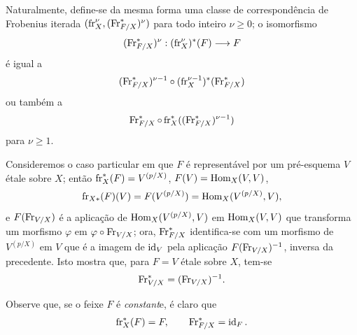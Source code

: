 Naturalmente, define-se da mesma forma uma classe de correspondência de Frobenius iterada $(\operatorname{fr}_X^\nu,(\operatorname{Fr}^*_{F/X})^\nu)$ para todo inteiro $\nu\geq0$; o isomorfismo
\[
(\operatorname{Fr}^*_{F/X})^\nu:(\operatorname{fr}_X^\nu)^*(F)\longrightarrow F
\]
é igual a
\[
(\operatorname{Fr}^*_{F/X})^{\nu-1}\circ (\operatorname{fr}_X^{\nu-1})^*(\operatorname{Fr}^*_{F/X})
\]
ou também a
\[
\operatorname{Fr}^*_{F/X}\circ\operatorname{fr}_X^*((\operatorname{Fr}^*_{F/X})^{\nu-1})
\]
para $\nu\geq1$.

Consideremos o caso particular em que $F$ é representável por um pré-esquema $V$ étale sobre $X$; então $\operatorname{fr}_X^*(F)=V^{(p/X)}$, $F(V)=\operatorname{Hom}_X(V,V)$,
\[
\operatorname{fr}_{X*}(F)(V)=F(V^{(p/X)})=\operatorname{Hom}_X(V^{(p/X)},V),
\]
e $F(\operatorname{Fr}_{V/X})$ é a aplicação de $\operatorname{Hom}_X(V^{(p/X)},V)$ em $\operatorname{Hom}_X(V,V)$ que transforma um morfismo $\varphi$ em $\varphi\circ\operatorname{Fr}_{V/X}$; ora, $\operatorname{Fr}^*_{F/X}$ identifica-se com um morfismo de $V^{(p/X)}$ em $V$ que é a imagem de $\operatorname{id}_V$ pela aplicação $F(\operatorname{Fr}_{V/X})^{-1}$, inversa da precedente. Isto mostra que, para $F=V$ étale sobre $X$, tem-se
\[
\operatorname{Fr}^*_{V/X}=(\operatorname{Fr}_{V/X})^{-1}.
\]

Observe que, se o feixe $F$ é \emph{constant}e, é claro que
\[
\operatorname{fr}_X^*(F)=F,
\qquad
\operatorname{Fr}^*_{F/X}=\operatorname{id}_F.
\]
